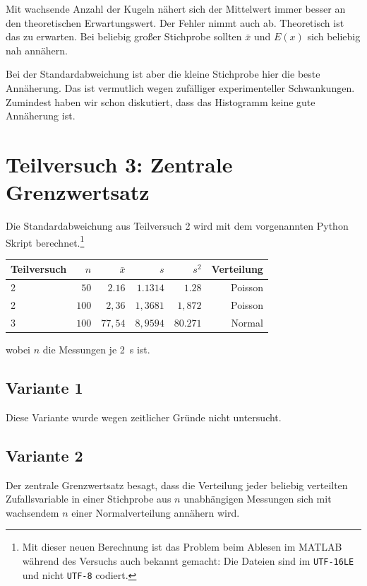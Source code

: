 \documentclass[twoside]{article}
\begin{document}
        Mit wachsende Anzahl der Kugeln nähert sich der Mittelwert immer besser an den theoretischen Erwartungswert. Der Fehler nimmt auch ab. Theoretisch ist das zu erwarten. Bei beliebig großer Stichprobe sollten $\bar{x}$ und $E(x)$ sich beliebig nah annähern.

        Bei der Standardabweichung ist aber die kleine Stichprobe hier die beste Annäherung. Das ist vermutlich wegen zufälliger experimenteller Schwankungen. Zumindest haben wir schon diskutiert, dass das Histogramm keine gute Annäherung ist. 
\newpage
\section*{Teilversuch 3: Zentrale Grenzwertsatz}
    Die Standardabweichung aus Teilversuch 2 wird mit dem vorgenannten Python Skript berechnet.\footnote{Mit dieser neuen Berechnung ist das Problem beim Ablesen im MATLAB während des Versuchs auch bekannt gemacht: Die Dateien sind im \texttt{UTF-16LE} und nicht \texttt{UTF-8} codiert.}
    
    \begin{center}
        \begin{tabular}{l | rrrrr}
            \toprule
            Teilversuch & $n$ & $\bar{x}$ & $s$ &$s^2$ & Verteilung \\
            \midrule
            2 & $50$  & $2.16$ & $1.1314$ & $1.28$ & Poisson\\
            2 & $100$ & $2,36$ & $1,3681$ & $1,872$ & Poisson\\
            3 & $100$ & $77,54$ & $8,9594$ & $80.271$ & Normal\\
            \bottomrule
        \end{tabular}
    \end{center}
    wobei $n$ die Messungen je \SI{2}{\second} ist. 

    \subsection*{Variante 1}
        Diese Variante wurde wegen zeitlicher Gründe nicht untersucht.
    \subsection*{Variante 2}
        Der zentrale Grenzwertsatz besagt, dass die Verteilung jeder beliebig verteilten Zufallsvariable in einer Stichprobe aus $n$ unabhängigen Messungen sich mit wachsendem $n$ einer Normalverteilung annähern wird. 
        
\end{document}
